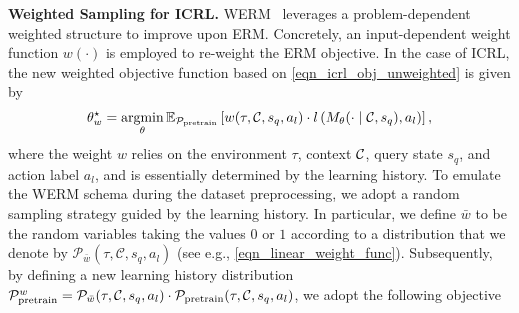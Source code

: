 \documentclass{article}
\begin{document}
\textbf{Weighted Sampling for ICRL.}
%
%
%
%
%
%
WERM~\cite{zhang2025reweighting} leverages a problem-dependent weighted structure to improve upon ERM. Concretely, an input-dependent weight function $w(\cdot)$ is employed to re-weight the ERM objective. In the case of ICRL, the new weighted objective function based on \eqref{eqn_icrl_obj_unweighted} is given by
%
\begin{align}\label{eqn_icrl_obj_weighted_train}
    \theta_w^\star = \argmin_\theta \mbE_{\ccalP_{\text{pretrain}}} \left[ w(\tau, \mathcal{C}, s_q, a_l) \cdot l \left( M_\theta(\cdot \mid \ccalC, s_{q}), a_{l}\right) \right],
\end{align}
%
where the weight $w$ relies on the environment $\tau$, context ${\mathcal C}$, query state $s_q$, and action label $a_l$, and is essentially determined by the learning history.
%
%
To emulate the WERM schema during the dataset preprocessing, we adopt a random sampling strategy guided by the learning history. In particular, we define $\bar{w}$ to be the random variables taking the values $0$ or $1$ according to a distribution that we denote by $\mathcal{P}_{\bar{w}}(\tau,\mathcal{C},s_q,a_l)$ (see e.g., \eqref{eqn_linear_weight_func}). Subsequently, by defining a new learning history distribution ${\mathcal P}_{\text{pretrain}}^w = \mathcal{P}_{\bar{w}}(\tau, \mathcal{C}, s_q, a_l) \cdot {\ensuremath{\mathcal P}}_{\text{pretrain}} (\tau, {\mathcal C}, s_{q}, a_{l})$, we adopt the following objective
\end{document}
